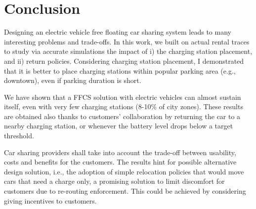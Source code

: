 \section{Conclusion}
\label{sec:conclusion}

Designing an electric vehicle free floating car sharing system leads to many interesting problems and trade-offs.
In this work, we built on actual rental traces to study via accurate simulations the impact of i) the charging station placement, and ii) return policies. 
Considering charging station placement, I demonstrated that it is better to place charging stations within popular parking area (e.g., downtown), even if parking duration is short.

We have shown that a FFCS solution with electric vehicles can almost sustain itself, even with very few charging stations (8-10\% of city zones). These results are obtained also thanks to customers' collaboration by returning the car to a nearby charging station, or whenever the battery level drops below a target threshold.

Car sharing providers shall take into account the trade-off between usability, costs and benefits for the customers. 
The results hint for possible alternative design solution, i.e.,  the adoption of simple relocation policies that would move cars that need a charge only, a promising solution to limit discomfort for customers due to re-routing enforcement. This could be achieved by considering giving incentives to customers.

